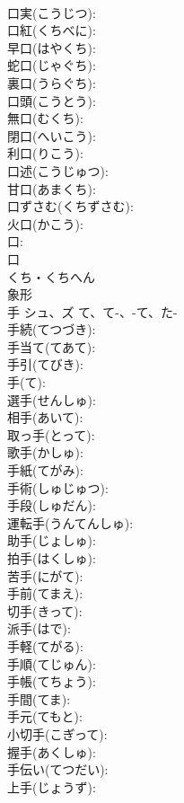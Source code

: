 \documentclass[8pt]{extreport}
\begin{document}
\begin{CJK}{UTF8}{min}
\\	口実(こうじつ): 
\\	口紅(くちべに): 
\\	早口(はやくち): 
\\	蛇口(じゃぐち): 
\\	裏口(うらぐち): 
\\	口頭(こうとう): 
\\	無口(むくち): 
\\	閉口(へいこう): 
\\	利口(りこう): 
\\	口述(こうじゅつ): 
\\	甘口(あまくち): 
\\	口ずさむ(くちずさむ): 
\\	火口(かこう): 
\\	口: 
\\	口	
\\	くち・くちへん	
\\	象形 
\\	手	シュ、ズ	て、て-、-て、た-		
\\	手続(てつづき): 
\\	手当て(てあて): 
\\	手引(てびき): 
\\	手(て): 
\\	選手(せんしゅ): 
\\	相手(あいて): 
\\	取っ手(とって): 
\\	歌手(かしゅ): 
\\	手紙(てがみ): 
\\	手術(しゅじゅつ): 
\\	手段(しゅだん): 
\\	運転手(うんてんしゅ): 
\\	助手(じょしゅ): 
\\	拍手(はくしゅ): 
\\	苦手(にがて): 
\\	手前(てまえ): 
\\	切手(きって): 
\\	派手(はで): 
\\	手軽(てがる): 
\\	手順(てじゅん): 
\\	手帳(てちょう): 
\\	手間(てま): 
\\	手元(てもと): 
\\	小切手(こぎって): 
\\	握手(あくしゅ): 
\\	手伝い(てつだい): 
\\	上手(じょうず): 

\end{CJK}
\end{document}

